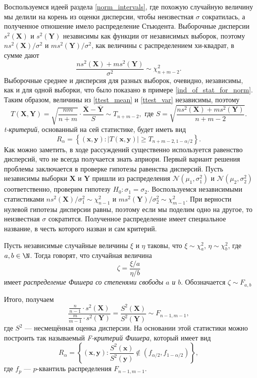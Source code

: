 Воспользуемся идеей раздела \ref{norm_intervals}, где похожую случайную величину мы делили на корень из оценки дисперсии, чтобы неизвестная $\sigma$ сократилась, а полученное отношение имело распределение Стьюдента. Выборочные дисперсии $s^2(\mathbf X)$ и $s^2(\mathbf Y)$ независимы как функции от независимых выборок, поэтому $ns^2(\mathbf X)/\sigma^2$ и $ms^2(\mathbf Y)/\sigma^2$, как величины с распределением хи-квадрат, в сумме дают
\begin{equation}\label{ttest_var}
    \frac{ns^2(\mathbf X) + ms^2(\mathbf Y)}{\sigma^2} \sim \chi^2_{n+m-2}.
\end{equation}
Выборочные среднее и дисперсия для разных выборок, очевидно, независимы, как и для одной выборки, что было показано в примере \ref{ind_of_stat_for_norm}. Таким образом, величины из \eqref{ttest_mean} и \eqref{ttest_var} независимы, поэтому
\begin{equation}\label{t-statistic-two-sample}
	T(\mathbf X, \mathbf Y) = \sqrt{\frac{nm}{n+m}}\cdot \frac{\overline{\mathbf X} - \overline{\mathbf Y}}{S} \sim T_{n+m-2},\text{   где   } S = \sqrt{\frac{ns^2(\mathbf X) + ms^2(\mathbf Y)}{n+m-2}}.
\end{equation}
\textit{t-критерий}, основанный на сей статистике, будет иметь вид
\[
R_{\alpha} = \left\{(\mathbf{x}, \mathbf{y})\colon |T(\mathbf{x}, \mathbf{y})| \ge T_{n+m-2,1-\alpha/2}\right\}.
\]
Как можно заметить, в ходе рассуждений существенно используется равенство дисперсий, что не всегда получается знать априори. Первый вариант решения проблемы заключается в проверке гипотезы равенства дисперсий. Пусть независимы выборки $\mathbf X$ и $\mathbf Y$ пришли из распределения $\mathcal{N}(\mu_1, \sigma_1^2)$ и $\mathcal{N}(\mu_2, \sigma_2^2)$ соответственно, проверим гипотезу $H_0\colon \sigma_1 = \sigma_2$. Воспользуемся независимыми статистиками $ns^2(\mathbf X)/\sigma^2_1 \sim \chi^2_{n-1}$ и $ms^2(\mathbf Y)/\sigma^2_2 \sim \chi^2_{m-1}$. При верности нулевой гипотезы дисперсии равны, поэтому если мы поделим одно на другое, то неизвестная $\sigma$ сократится. Полученное распределение имеет специальное название, в честь которого назван и сам критерий.
\begin{definition}
Пусть независимые случайные величины $\xi$ и $\eta$ таковы, что $\xi \sim \chi^2_{a}$, $\eta \sim \chi^2_{b}$, где $a, b\in \N$. Тогда говорят, что случайная величина
\[
\zeta = \frac{\xi / a}{\eta / b}
\]
имеет \textit{распределение Фишера со степенями свободы $a$ и $b$}. Обозначается $\zeta \sim F_{a, b}$
\end{definition}
Итого, получаем
\[
\frac{\frac{n}{n-1}\cdot s^2(\mathbf X)}{\frac{m}{m-1}\cdot s^2(\mathbf Y)} = \frac{S^2(\mathbf X)}{S^2(\mathbf Y)} \sim F_{n-1,m-1},
\]
где $S^2$ --- несмещённая оценка дисперсии. На основании этой статистики можно построить так называемый \textit{F-критерий Фишера}, который имеет вид
\[
R_{\alpha} = \left\{(\mathbf{x}, \mathbf{y})\colon \frac{S^2(\mathbf{x})}{S^2(\mathbf{y})} \notin (f_{\alpha/2}, f_{1-\alpha/2})\right\},
\]
где $f_p$ --- $p$-квантиль распределения $F_{n-1,m-1}$.

